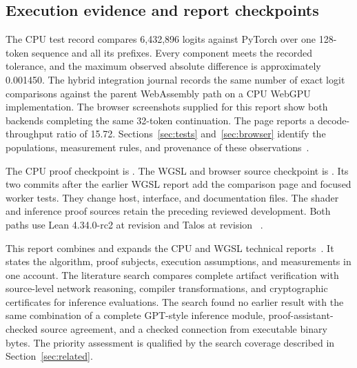 \subsection{Execution evidence and report checkpoints}

The CPU test record compares 6,432,896 logits against PyTorch over one 128-token sequence and all its prefixes.  Every component meets the recorded tolerance, and the maximum observed absolute difference is approximately 0.001450.  The hybrid integration journal records the same number of exact logit comparisons against the parent WebAssembly path on a CPU WebGPU implementation.  The browser screenshots supplied for this report show both backends completing the same 32-token continuation.  The page reports a decode-throughput ratio of 15.72.  Sections~\ref{sec:tests} and~\ref{sec:browser} identify the populations, measurement rules, and provenance of these observations~\cite{tests,wg-journal}.

The CPU proof checkpoint is .  The WGSL and browser source checkpoint is .  Its two commits after the earlier WGSL report add the comparison page and focused worker tests.  They change host, interface, and documentation files.  The shader and inference proof sources retain the preceding reviewed development.  Both paths use Lean 4.34.0-rc2 at revision  and Talos at revision ~\cite{repo,wg-checkpoint,talos}.

This report combines and expands the CPU and WGSL technical reports~\cite{cpu-report,wg-report}.  It states the algorithm, proof subjects, execution assumptions, and measurements in one account.  The literature search compares complete artifact verification with source-level network reasoning, compiler transformations, and cryptographic certificates for inference evaluations.  The search found no earlier result with the same combination of a complete GPT-style inference module, proof-assistant-checked source agreement, and a checked connection from executable binary bytes.  The priority assessment is qualified by the search coverage described in Section~\ref{sec:related}.
